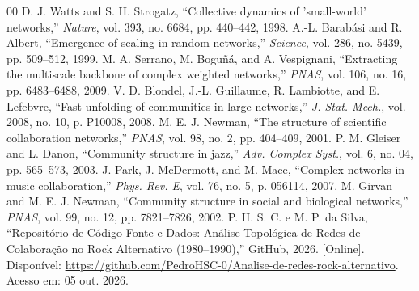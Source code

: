 \documentclass[conference]{IEEEtran}
\begin{document}
\begin{thebibliography}{00}
 D. J. Watts and S. H. Strogatz, ``Collective dynamics of 'small-world' networks,'' \textit{Nature}, vol. 393, no. 6684, pp. 440--442, 1998.
 A.-L. Barabási and R. Albert, ``Emergence of scaling in random networks,'' \textit{Science}, vol. 286, no. 5439, pp. 509--512, 1999.
 M. A. Serrano, M. Boguñá, and A. Vespignani, ``Extracting the multiscale backbone of complex weighted networks,'' \textit{PNAS}, vol. 106, no. 16, pp. 6483--6488, 2009.
 V. D. Blondel, J.-L. Guillaume, R. Lambiotte, and E. Lefebvre, ``Fast unfolding of communities in large networks,'' \textit{J. Stat. Mech.}, vol. 2008, no. 10, p. P10008, 2008.
 M. E. J. Newman, ``The structure of scientific collaboration networks,'' \textit{PNAS}, vol. 98, no. 2, pp. 404--409, 2001.
 P. M. Gleiser and L. Danon, ``Community structure in jazz,'' \textit{Adv. Complex Syst.}, vol. 6, no. 04, pp. 565--573, 2003.
 J. Park, J. McDermott, and M. Mace, ``Complex networks in music collaboration,'' \textit{Phys. Rev. E}, vol. 76, no. 5, p. 056114, 2007.
 M. Girvan and M. E. J. Newman, ``Community structure in social and biological networks,'' \textit{PNAS}, vol. 99, no. 12, pp. 7821--7826, 2002.
 P. H. S. C. e M. P. da Silva, ``Repositório de Código-Fonte e Dados: Análise Topológica de Redes de Colaboração no Rock Alternativo (1980--1990),'' GitHub, 2026. [Online]. Disponível: \url{https://github.com/PedroHSC-0/Analise-de-redes-rock-alternativo}. Acesso em: 05 out. 2026.
\end{thebibliography}
\end{document}
